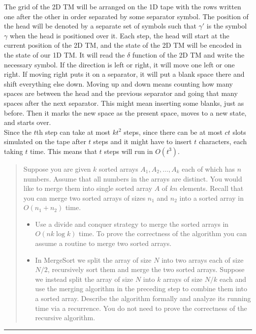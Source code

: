 \documentclass[11pt]{article}
\begin{document}
\begin{solution}
    The grid of the 2D TM will be arranged on the 1D tape with the rows written one after the other in order separated by some separator symbol. The position of the head will be denoted by a separate set of symbols such that $\gamma'$ is the symbol $\gamma$ when the head is positioned over it. Each step, the head will start at the current position of the 2D TM, and the state of the 2D TM will be encoded in the state of our 1D TM. It will read the $\delta$ function of the 2D TM and write the necessary symbol. If the direction is left or right, it will move one left or one right. If moving right puts it on a separator, it will put a blank space there and shift everything else down. Moving up and down means counting how many spaces are between the head and the previous separator and going that many spaces after the next separator. This might mean inserting some blanks, just as before. Then it marks the new space as the present space, moves to a new state, and starts over. \\

    Since the $t$th step can take at most $kt^2$ steps, since there can be at most $ct$ slots simulated on the tape after $t$ steps and it might have to insert $t$ characters, each taking $t$ time. This means that $t$ steps will run in $O(t^3)$.
\end{solution}


\begin{quote}
    Suppose you are given $k$ sorted arrays $A_1,A_2,\ldots,A_k$
  each of which has $n$ numbers. Assume that all numbers in the arrays
  are distinct. You would like to merge them into single sorted array
  $A$ of $kn$ elements. Recall that you can merge two sorted arrays of
  sizes $n_1$ and $n_2$ into a sorted array in $O(n_1+n_2)$ time.
  \begin{itemize}
  \item Use a divide and conquer strategy to merge the sorted arrays
    in $O(nk \log k)$ time. To prove the correctness of the algorithm
    you can assume a routine to merge two sorted arrays.
  \item In MergeSort we split the array of size $N$ into two arrays
    each of size $N/2$, recursively sort them and merge the two sorted
    arrays. Suppose we instead split the array of size $N$ into $k$
    arrays of size $N/k$ each and use the merging algorithm in the
    preceding step to combine them into a sorted array.  Describe the
    algorithm formally and analyze its running time via a recurrence.
    You do not need to prove the correctness of the recursive algorithm.
  \end{itemize}
\end{quote}
\hrule
\end{document}

